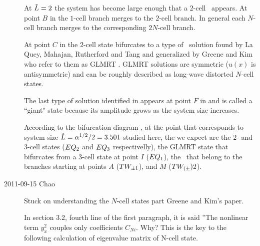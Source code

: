 \begin{description}
At $\tilde{L}=2$ the system has become large enough that a $2$-cell \eqv\ appears. At point $B$
in  the $1$-cell branch merges to the $2$-cell branch. In general each $N$-cell branch merges to the corresponding $2N$-cell branch.

At point $C$ in  the $2$-cell state
bifurcates to a type of \eqv\ solution found by La Quey,
Mahajan, Rutherford and Tang and generalized by
Greene and Kim who refer to them as GLMRT \eqva. GLMRT
solutions are symmetric ($u(x)$ is antisymmetric) and can be
roughly described as long-wave distorted $N$-cell states.

The last type of solution identified in  appears at point $F$
in  and is called a
``giant" state because its amplitude grows as the system size increases.

According to the bifurcation diagram ,
at the point that corresponds to system size $\tilde{L}=\alpha^{1/2}/2=3.501$
studied here,
the {\eqva} we expect are the $2$- and $3$-cell states ($EQ_{2}$ and $EQ_{3}$ respectivelly), the GLMRT state that bifurcates from a $3$-cell state at point $I$ ($EQ_{1}$),
the \reqva\ that belong to the branches starting at points $A$ ($TW_{\pm1}$),
and $M$ ($TW_{(\pm}){2}$).


\item[2011-09-15 Chao]
Stuck on understanding the $N$-cell states part Greene and Kim's paper.

In section 3.2, fourth line of the first paragraph, it is said ''The
nonlinear term $y_x^2$ couples only coefficients $C_{Ni}$. Why? This is
the key to the following calculation of eigenvalue matrix of N-cell
state.


\end{description}
